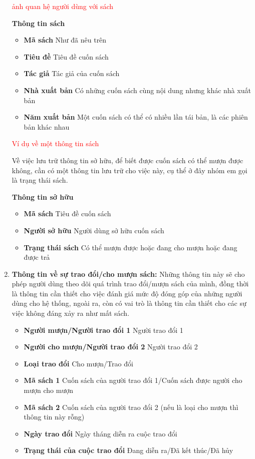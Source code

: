 \documentclass[../thesis.tex]{subfiles}
\begin{document}
\begin{enumerate}
			\textcolor{red}{ảnh quan hệ người dùng với sách}
			
			\textbf{Thông tin sách}
			\begin{itemize}
				\item \textbf{Mã sách} Như đã nêu trên\\
				\item \textbf{Tiêu đề} Tiêu đề cuốn sách\\
				\item \textbf{Tác giả} Tác giả của cuốn sách\\
				\item \textbf{Nhà xuất bản} Có những cuốn sách cùng nội dung nhưng khác nhà xuất bản\\
				\item \textbf{Năm xuất bản} Một cuốn sách có thể có nhiều lần tái bản, là các phiên bản khác nhau\\
			\end{itemize}				
			\textcolor{red}{Ví dụ về một thông tin sách}
			
			Về việc lưu trữ thông tin sở hữu, để biết được cuốn sách có thể mượn được không, cần có một thông tin lưu trữ cho việc này, cụ thể ở đây nhóm em gọi là trạng thái sách.			
			
			\textbf{Thông tin sở hữu}					
			\begin{itemize}
				\item \textbf{Mã sách} Tiêu đề cuốn sách \\
				\item \textbf{Người sở hữu} Người dùng sở hữu cuốn sách \\
				\item \textbf{Trạng thái sách} Có thể mượn được hoặc đang cho mượn hoặc đang được trả \\
			\end{itemize}
		
		\item \textbf{Thông tin về sự trao đổi/cho mượn sách: }
			Những thông tin này sẽ cho phép người dùng theo dõi quá trình trao đổi/mượn sách của mình, đồng thời là thông tin cần thiết cho việc đánh giá mức độ đóng góp của những người dùng cho hệ thống, ngoài ra, còn có vai trò là thông tin cần thiết cho các sự việc không đáng xảy ra như mất sách.
			\begin{itemize}
				\item \textbf{Người mượn/Người trao đổi 1} Người trao đổi 1
				\item \textbf{Người cho mượn/Người trao đổi 2} Người trao đổi 2
				\item \textbf{Loại trao đổi} Cho mượn/Trao đổi
				\item \textbf{Mã sách 1} Cuốn sách của người trao đổi 1/Cuốn sách được người cho mượn cho mượn
				\item \textbf{Mã sách 2} Cuốn sách của người trao đổi 2 (nếu là loại cho mượn thì thông tin này rỗng)
				\item \textbf{Ngày trao đổi} Ngày tháng diễn ra cuộc trao đổi
				\item \textbf{Trạng thái của cuộc trao đổi} Đang diễn ra/Đã kết thúc/Đã hủy
			\end{itemize}		
	\end{enumerate}
\end{document}

